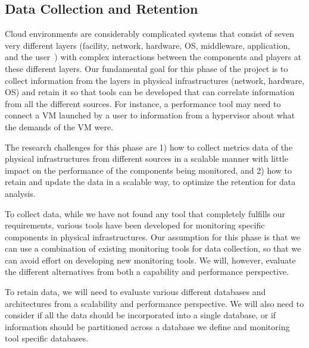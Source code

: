 \subsection{Data Collection and Retention}

Cloud environments are considerably complicated systems that consist of seven very different layers (facility, network, hardware, OS, middleware, application, and the user~\cite{spring2011monitoring}) with complex interactions between the components and players at these different layers.  Our fundamental goal for this phase of the project is to collect information from the layers in physical infrastructures (network, hardware, OS) and retain it so that tools can be developed that can correlate information from all the different sources. For instance, a performance tool may need to connect a VM launched by a user to information from a hypervisor about what the demands of the VM were. 


The research challenges for this phase are 1) how to collect metrics data of the physical infrastructures from different sources in a scalable manner with little impact on the performance of the components being monitored, and 2) how to retain and update the data in a scalable way, to optimize the retention for data analysis.

To collect data, while we have not found any tool that completely fulfills our requirements, various tools have been developed for monitoring specific components in physical infrastructures. Our assumption for this phase is that we can use a combination of existing monitoring tools for data collection, so that we can avoid effort on developing new monitoring tools. We will, however, evaluate the different alternatives from both a capability and performance perspective.

To retain data, we will need to evaluate various different databases and architectures from a scalability and performance perspective. We will also need to consider if all the data should be incorporated into a single database, or if information should be partitioned across a database we define and monitoring tool specific databases.

